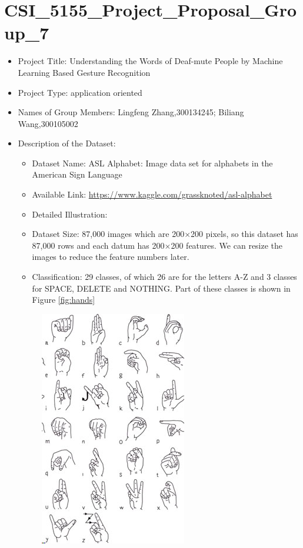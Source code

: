 \documentclass{article}
\begin{document}
\section*{CSI\_5155\_Project\_Proposal\_Group\_7}

\begin{itemize}
\item Project Title: Understanding the Words of Deaf-mute People by Machine Learning Based Gesture Recognition
\item Project Type: application oriented
\item Names of Group Members: Lingfeng Zhang,300134245; Biliang Wang,300105002
\item Description of the Dataset: 
    \begin{itemize}
        \item Dataset Name: ASL Alphabet: Image data set for alphabets in the American Sign Language
        \item Available Link: \newline \url{https://www.kaggle.com/grassknoted/asl-alphabet}
        \item Detailed Illustration: 
        \item Dataset Size: 87,000 images which are 200$\times$200 pixels, so this dataset has 87,000 rows and each datum has 200$\times$200 features. We can resize the images to reduce the feature numbers later.
        \item Classification: 29 classes, of which 26 are for the letters A-Z and 3 classes for SPACE, DELETE and NOTHING. Part of these classes is shown in Figure \ref{fig:hands}
    \end{itemize}
    	\begin{figure}[h!]
        \centering
        \includegraphics[scale=0.7]{NIDCD-ASL-hands-2014.jpg}

\end{figure}
\end{itemize}
\end{document}
